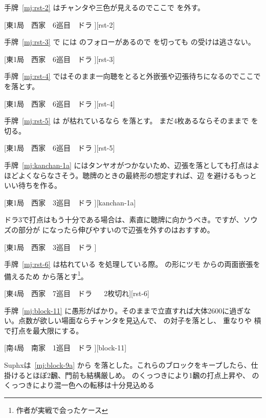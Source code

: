 \documentclass[../nankiru_main.tex]{subfiles}
\begin{document}
手牌~\ref{mj:rst-2} はチャンタや三色が見えるのでここで  を外す。

[東1局　西家　6巡目　ドラ ][rst-2]

手牌~\ref{mj:rst-3} で  には  のフォローがあるので  を切っても  の受けは逃さない。

[東1局　西家　6巡目　ドラ ][rst-3]

手牌~\ref{mj:rst-4} ではそのまま一向聴をとると外嵌張や辺張待ちになるのでここで  を落とす。

[東1局　西家　6巡目　ドラ ][rst-4]

手牌~\ref{mj:rst-5} は  が枯れているなら  を落とす。 まだ4枚あるならそのままで  を切る。

[東1局　西家　6巡目　ドラ ][rst-5]

手牌~\ref{mj:kanchan-1a} にはタンヤオがつかないため、辺張を落としても打点はよほどよくならなさそう。聴牌のときの最終形の想定すれば、辺  を避けるもっといい待ちを作る\citep[][pp. 48--55]{tetsusenryaku}。

[東1局　西家　3巡目　ドラ ][kanchan-1a]

ドラ3で打点はもう十分である場合は、素直に聴牌に向かうべき。ですが、ソウズの部分が  になったら伸びやすいので辺張を外すのはおすすめ。

[東1局　西家　3巡目　ドラ ]

手牌~\ref{mj:rst-6} は枯れている  を処理している際。 の形にツモ  からの両面嵌張を備えるため  から落とす\footnote{作者が実戦で会ったケース}。

[東4局　西家　7巡目　ドラ 　 2枚切れ][rst-6]

手牌~\ref{mj:block-11} に愚形がばかり。そのままで立直すれば大体2600に過ぎない。点数が欲しい場面ならチャンタを見込んで、 の対子を落とし、 重なりや  槓で打点を最大限にする\citep[][pp. 74--79]{tetsusenryaku}。

[南4局　南家　1巡目　ドラ ][block-11]

Suphxは~\ref{mj:block-9a} から  を落とした\citep[][pp.~158--159]{suphx}。これらのブロックをキープしたら、仕掛けるとほぼ2飜、門前も結構厳しめ。 のくっつきにより1飜の打点上昇や、 のくっつきにより混一色への転移は十分見込める
\end{document}
